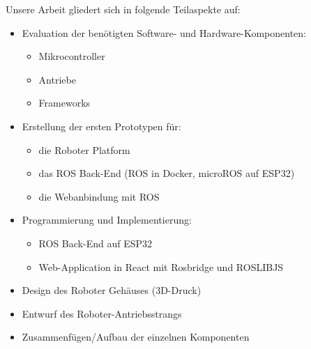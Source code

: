 \begin{flushleft}
    Unsere Arbeit gliedert sich in folgende Teilaspekte auf:
    \begin{itemize}
            \item Evaluation der benötigten Software- und Hardware-Komponenten:
            \begin{itemize}
                \item Mikrocontroller
                \item Antriebe
                \item Frameworks 
            \end{itemize}
            \item Erstellung der ersten Prototypen für:
            \begin{itemize}
                \item die Roboter Platform
                \item das ROS Back-End (ROS in Docker, microROS auf ESP32)
                \item die Webanbindung mit ROS
            \end{itemize}
            \item Programmierung und Implementierung:
            \begin{itemize}
                \item ROS Back-End auf ESP32
                \item Web-Application in React mit Rosbridge und ROSLIBJS
            \end{itemize}
            \item Design des Roboter Gehäuses (3D-Druck)
            \item Entwurf des Roboter-Antriebsstrangs
            \item Zusammenfügen/Aufbau der einzelnen Komponenten
    \end{itemize}

\end{flushleft}